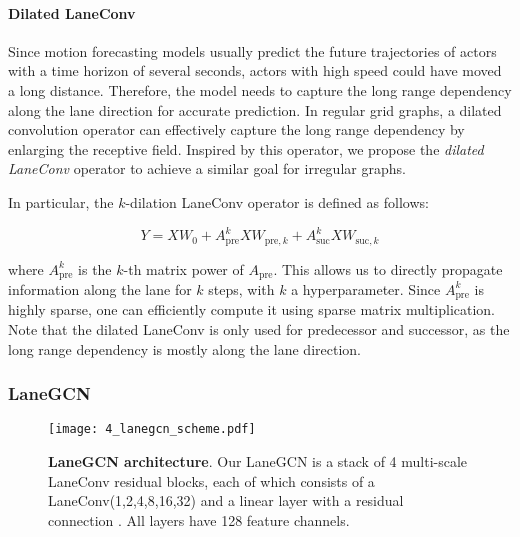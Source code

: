 \paragraph{Dilated LaneConv}

Since motion forecasting models usually predict the future trajectories of actors with a time horizon of several seconds, actors with high speed could have moved a long distance.
Therefore, the model needs to capture the long range dependency along the lane direction for accurate prediction. In regular grid graphs, a dilated convolution operator \cite{yu2015multi} can effectively capture the long range dependency by enlarging the receptive field. Inspired by this operator, we propose the \textit{dilated LaneConv} operator to achieve a similar goal for irregular graphs. 

In particular, the $k$-dilation LaneConv operator is defined as follows:
 
\begin{equation}
	Y = XW_0 + A_{\text{pre}}^k X W_{\text{pre},k} + A_{\text{suc}}^k X W_{\text{suc},k}
	\label{eqn:dilated_laneconv}
\end{equation}

where $A_{\text{pre}}^k$ is the $k$-th matrix power of $A_{\text{pre}}$. 
This  allows us to directly propagate information along the lane for $k$ steps, with $k$ a hyperparameter. Since $A_{\text{pre}}^k$ is highly sparse, one can efficiently compute it using sparse matrix multiplication. Note that the dilated LaneConv is only used for predecessor and successor, as the long range dependency is mostly along the lane direction.

\subsubsection{LaneGCN}\label{sec:LGN}
\label{subsubsec:4_improving_efficiency_lanegcn}

\begin{figure}[t]                                                                                                                           
	\begin{center}
		\texttt{[image: 4\_lanegcn\_scheme.pdf]}
	\end{center}
	\caption{\textbf{LaneGCN architecture}. Our LaneGCN is a stack of 4 multi-scale LaneConv residual blocks, each of which consists of a LaneConv(1,2,4,8,16,32) and a linear layer with a residual connection \cite{residual}. All layers have 128 feature channels.
	}
	\label{fig:4_improving_efficiency_lanegcn}
\end{figure}

